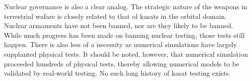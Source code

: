 Nuclear governance is also a clear analog.  The strategic nature of
the weapons in terrestrial wafare is closely related to that of
\acp{kasat} in the orbital domain.  Nuclear armaments have not been
banned, nor are they likely to be banned.  While much progress has
been made on banning nuclear testing, those tests still happen.  There
is also less of a necessity as numerical simulations have largely
supplanted physical tests.  It should be noted, however, that
numerical simulation proceeded hundreds of physical tests, thereby
allowing numerical models to be validated by real-world testing.  No
such long history of \ac{kasat} testing exists.
